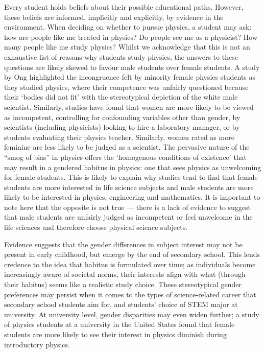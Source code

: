 Every student holds beliefs about their possible educational paths. However, these beliefs are informed, implicitly and explicitly, by evidence in the environment. When deciding on whether to pursue physics, a student may ask: how are people like me treated in physics? Do people see me as a physicist? How many people like me study physics? Whilst we acknowledge that this is not an exhaustive list of reasons why students study physics, the answers to these questions are likely skewed to favour male students over female students. A study by Ong\cite{ong2005body} highlighted the incongruence felt by minority female physics students as they studied physics, where their competence was unfairly questioned because their `bodies did not fit' with the stereotypical depiction of the white male scientist. Similarly, studies have found that women are more likely to be viewed as incompetent, controlling for confounding variables other than gender, by scientists (including physicists) looking to hire a laboratory manager\cite{Moss_2012}, or by students evaluating their physics teacher.\cite{Potvin_2016} Similarly, women rated as more feminine are less likely to be judged as a scientist.\cite{Banchefsky2016} The pervasive nature of the ``smog of bias''\cite{Kost_Smith_2010} in physics offers the `homogenous conditions of existence' that may result in a gendered habitus in physics: one that sees physics as unwelcoming for female students. This is likely to explain why studies tend to find that female students are more interested in life science subjects\cite{Buccheri_2011} and male students are more likely to be interested in physics, engineering and mathematics.\cite{Su_2009, B_E_2013, Cunningham_2015} It is important to note here that the opposite is not true --- there is a lack of evidence to suggest that male students are unfairly judged as incompetent or feel unwelcome in the life sciences and therefore choose physical science subjects.  

Evidence suggests that the gender differences in subject interest may not be present in early childhood, but emerge by the end of secondary school.\cite{Baram_Tsabari_2010} This lends credence to the idea that habitus is formulated over time; as individuals become increasingly aware of societal norms, their interests align with what (through their habitus) seems like a realistic study choice. These stereotypical gender preferences may persist when it comes to the types of science-related career that secondary school students aim for\cite{Kj_rnsli_2011}, and students' choice of STEM major at university.\cite{Bottia_2015, Sadler_2012} At university level, gender disparities may even widen further; a study of physics students at a university in the United States found that female students are more likely to see their interest in physics diminish during introductory physics.\cite{Kost_Smith_2010}

